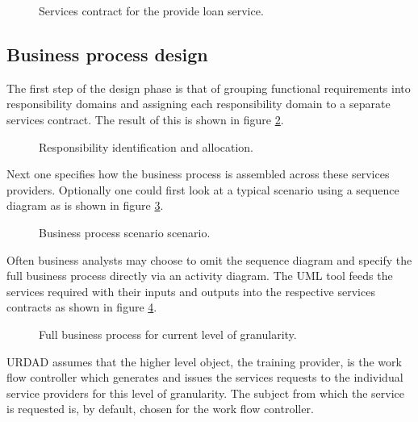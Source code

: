 \documentclass[reviewcopy]{elsart}
\begin{document}
\begin{figure}
  \centering
  \caption{Services contract for the provide loan service.}
  \label{fig:provideLoanContract}
\end{figure}


\subsection{Business process design}


The first step of the design phase is that of grouping functional requirements
into responsibility domains and assigning each responsibility domain to a
separate services contract. The result of this is shown in figure
\ref{fig:provideLoanResponsibilityAllocation}.

\begin{figure}
  \centering
  \caption{Responsibility identification and allocation.}
  \label{fig:provideLoanResponsibilityAllocation}
\end{figure}

Next one specifies how the business process is assembled across these services
providers. Optionally one could first look at a typical scenario using a
sequence diagram as is shown in figure
\ref{fig:provideLoanSuccessScenario}.


\begin{figure}
  \centering
  \caption{Business process scenario scenario.}
  \label{fig:provideLoanSuccessScenario}
\end{figure}

Often business analysts may choose to omit the sequence diagram and specify the
full business process directly via an activity diagram. The UML tool feeds the
services required with their inputs and outputs into the respective
services contracts as shown in figure \ref{fig:provideLoanBusinessProcess}.

\begin{figure}
  \centering
  \caption{Full business process for current level of granularity.}
  \label{fig:provideLoanBusinessProcess}
\end{figure}

URDAD assumes that the higher level object, the training
provider, is the work flow controller which generates and issues the services
requests to the individual service providers for this level of granularity. The
subject from which the service is requested is, by default, chosen for the work
flow controller.
\end{document}
